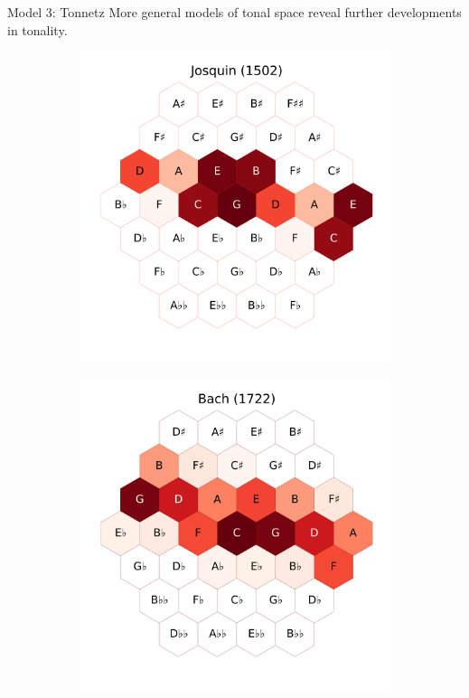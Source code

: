 \documentclass[final]{beamer}
\begin{document}
\begin{frame}[t]
\begin{minipage}[t][.6\textheight][t]{\textwidth}
\begin{columns}[t]
\begin{column}{0.3\textwidth}
			\begin{block}{Model 3: Tonnetz}
        More general models of tonal space reveal further developments in tonality.
				\begin{figure}
				\centering
				\begin{subfigure}{\textwidth} %
					\includegraphics[width=\textwidth]{img/josquin_tonnetz.png}
				\end{subfigure}
				\begin{subfigure}{\textwidth} %
					\includegraphics[width=\textwidth]{img/bach_tonnetz.png}

\end{subfigure}
\end{figure}
\end{block}
\end{column}
\end{columns}
\end{minipage}
\end{frame}
\end{document}
